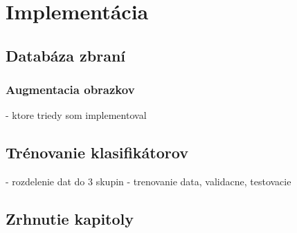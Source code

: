 
\chapter{Implementácia}



\section{Databáza zbraní}

\subsection{Augmentacia obrazkov}
- ktore triedy som implementoval


\section{Trénovanie klasifikátorov}
- rozdelenie dat do 3 skupin - trenovanie data, validacne, testovacie

\section{Zrhnutie kapitoly}
